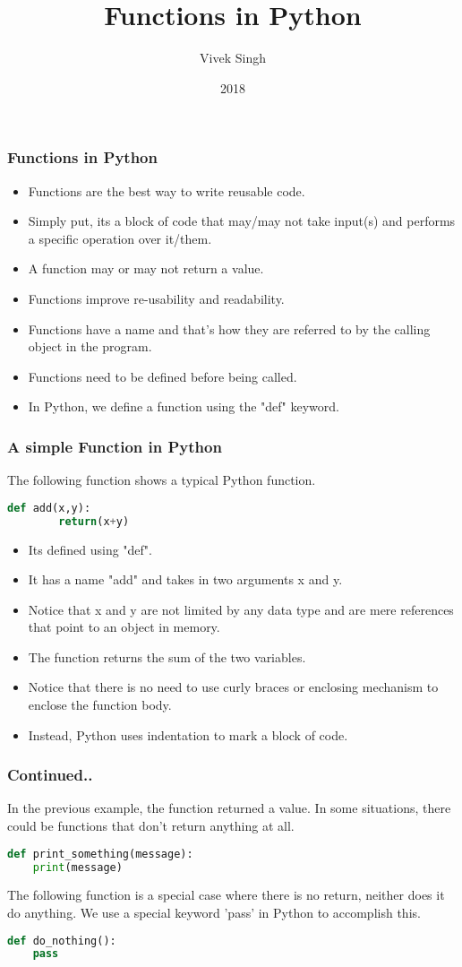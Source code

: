 \documentclass{beamer}
\title{Functions in Python}
\author{Vivek Singh}
\institute{Information Systems Decision Sciences (ISDS)\\
MUMA College of Business\\
University of South Florida \\
Tampa, Florida}
\date{2018}
\begin{document}
\frame{\titlepage}

\begin{frame}
\frametitle{Functions in Python}
\begin{itemize}
\item Functions are the best way to write reusable code.
\item Simply put, its a block of code that may/may not take input(s) and performs a specific operation over it/them.
\item A function may or may not return a value.
\item Functions improve re-usability and readability.
\item Functions have a name and that's how they are referred to by the calling object in the program.
\item Functions need to be defined before being called.
\item In Python, we define a function using the "def" keyword.
\end{itemize}
\end{frame}

\begin{frame}[fragile]
\frametitle{A simple Function in Python}
The following function shows a typical Python function.
\begin{lstlisting}[language=Python]
	def add(x,y):
		return(x+y)
\end{lstlisting}
\begin{itemize}
\item Its defined using "def".
\item It has a name "add" and takes in two arguments x and y.
\item Notice that x and y are not limited by any data type and are mere references that point to an object in memory.
\item The function returns the sum of the two variables.
\item Notice that there is no need to use curly braces or enclosing mechanism to enclose the function body.
\item Instead, Python uses indentation to mark a block of code.
\end{itemize}

\end{frame}

\begin{frame}[fragile]
\frametitle{Continued..}
In the previous example, the function returned a value. In some situations, there could be functions that don't return anything at all.
\begin{lstlisting}[language=Python]
def print_something(message):
	print(message)
\end{lstlisting}

The following function is a special case where there is no return, neither does it do anything. We use a special keyword 'pass' in Python to accomplish this.
\begin{lstlisting}[language=Python]
def do_nothing():
	pass
\end{lstlisting}
\end{frame}
\end{document}
